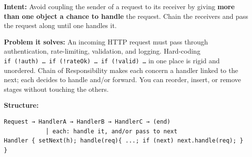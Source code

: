 \documentclass[11pt]{article}
\begin{document}
\textbf{Intent:} Avoid coupling the sender of a request to its receiver by giving \textbf{more than one object a chance to handle} the request. Chain the receivers and pass the request along until one handles it.

\textbf{Problem it solves:} An incoming HTTP request must pass through authentication, rate-limiting, validation, and logging. Hard-coding \texttt{if\ (!auth)\ …\ if\ (!rateOk)\ …\ if\ (!valid)\ …} in one place is rigid and unordered. Chain of Responsibility makes each concern a handler linked to the next; each decides to handle and/or forward. You can reorder, insert, or remove stages without touching the others.

\textbf{Structure:}

\setcodelang{}

\begin{verbatim}
Request → HandlerA → HandlerB → HandlerC → (end)
            │ each: handle it, and/or pass to next
Handler { setNext(h); handle(req){ ...; if (next) next.handle(req); } }
\end{verbatim}

\end{document}
